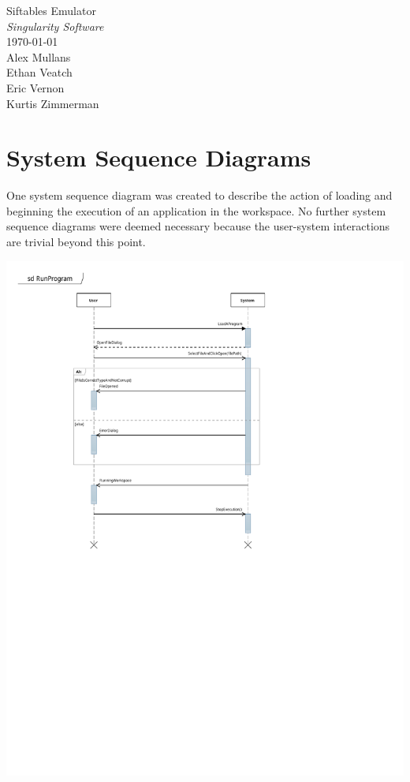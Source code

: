 \documentclass[12pt]{article}
\begin{document}
\vspace*{\fill}
        \begin{center}
                \LARGE{Siftables Emulator} \\
                \LARGE{\textit{Singularity Software}} \\
                \vspace{.15in}
                \large{\today} \\
                \vspace{4in}
                        Alex Mullans \\
                        Ethan Veatch \\
                        Eric Vernon \\
                        Kurtis Zimmerman
        \end{center}
\vspace*{\fill}
\thispagestyle{empty}

\section{System Sequence Diagrams}
One system sequence diagram was created to describe the action of loading and beginning the execution of an application in the workspace.  No further system sequence diagrams were deemed necessary because the user-system interactions are trivial beyond this point.
\begin{center}
        \includegraphics[scale=.75]{./pdfs/Models/SSD - RunProgram.pdf}
\end{center}
\end{document}
